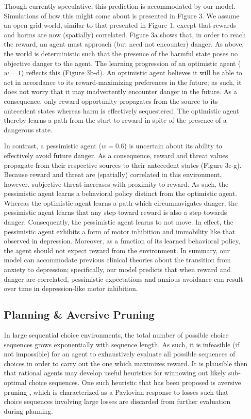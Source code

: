 \documentclass[11pt]{article} %
\begin{document}
Though currently speculative, this prediction is accommodated by our model. Simulations of how this might come about is presented in Figure 3. We assume an open grid world, similar to that presented in Figure 1, except that rewards and harms are now (spatially) correlated. Figure 3a shows that, in order to reach the reward, an agent must approach (but need not encounter) danger. As above, the world is deterministic such that the presence of the harmful state poses no objective danger to the agent. The learning progression of an optimistic agent ($w=1$) reflects this (Figure 3b-d). An optimistic agent believes it will be able to act in accordance to its reward-maximizing preferences in the future; as such, it does not worry that it may inadvertently encounter danger in the future. As a consequence, only reward opportunity propagates from the source to its antecedent states whereas harm is effectively sequestered. The optimistic agent thereby learns a path from the start to reward in spite of the presence of a dangerous state.

In contrast, a pessimistic agent ($w=0.6$) is uncertain about its ability to effectively avoid future danger. As a consequence, reward and threat values propagate from their respective sources to their antecedent states (Figure 3e-g). Because reward and threat are (spatially) correlated in this environment, however, subjective threat increases with proximity to reward. As such, the pessimistic agent learns a behavioral policy distinct from the optimistic agent. Whereas the optimistic agent learns a path which circumnavigates danger, the pessimistic agent learns that any step toward reward is also a step towards danger. Consequently, the pessimistic agent learns to not move. In effect, the pessimistic agent exhibits a form of motor inhibition and immobility like that observed in depression. Moreover, as a function of its learned behavioral policy, the agent should not expect reward from the environment. In summary, our model can accommodate previous clinical theories about the transition from anxiety to depression; specifically, our model predicts that when reward and danger are correlated, pessimistic expectations and anxious avoidance can result over time in depression-like motor inhibition.

\subsection{Planning \& Aversive Pruning}

In large sequential choice environments, the total number of possible choice sequences grows exponentially with sequence length. As such, it is infeasible (if not impossible) for an agent to exhaustively evaluate all possible sequences of choices in order to carry out the one which maximizes reward. It is plausible then that rational agents may develop useful heuristics for winnowing out likely sub-optimal choice sequences. One such heuristic that has been proposed is aversive pruning \citep{Huys2012}, which is characterized as a Pavlovian response to losses such that choice sequences involving large losses are discarded from further evaluation during planning. 
\end{document}
